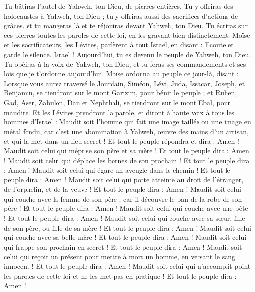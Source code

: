 \begin{multicols}{2}
Tu bâtiras l'autel de Yahweh, ton Dieu, de pierres entières. Tu y offriras des holocaustes à Yahweh, ton Dieu ;
tu y offriras aussi des sacrifices d’actions de grâces, et tu mangeras là et te réjouiras devant Yahweh, ton Dieu.
Tu écriras sur ces pierres toutes les paroles de cette loi, en les gravant bien distinctement.
Moïse et les sacrificateurs, les Lévites, parlèrent à tout Israël, en disant : Ecoute et garde le silence, Israël ! Aujourd'hui, tu es devenu le peuple de Yahweh, ton Dieu.
Tu obéiras à la voix de Yahweh, ton Dieu, et tu feras ses commandements et ses lois que je t’ordonne aujourd'hui.
Moïse ordonna au peuple ce jour-là, disant :
Lorsque vous aurez traversé le Jourdain, Siméon, Lévi, Juda, Issacar, Joseph, et Benjamin, se tiendront sur le mont Garizim, pour bénir le peuple ;
et Ruben, Gad, Aser, Zabulon, Dan et Nephthali, se tiendront sur le mont Ebal, pour maudire.
Et les Lévites prendront la parole, et diront à haute voix à tous les hommes d'Israël :
Maudit soit l'homme qui fait une image taillée ou une image en métal fondu, car c'est une abomination à Yahweh, œuvre des mains d'un artisan, et qui la met dans un lieu secret ! Et tout le peuple répondra et dira : Amen !
Maudit soit celui qui méprise son père et sa mère ! Et tout le peuple dira : Amen !
Maudit soit celui qui déplace les bornes de son prochain ! Et tout le peuple dira : Amen !
Maudit soit celui qui égare un aveugle dans le chemin ! Et tout le peuple dira : Amen !
Maudit soit celui qui porte atteinte au droit de l'étranger, de l'orphelin, et de la veuve ! Et tout le peuple dira : Amen !
Maudit soit celui qui couche avec la femme de son père ; car il découvre le pan de la robe de son père ! Et tout le peuple dira : Amen !
Maudit soit celui qui couche avec une bête ! Et tout le peuple dira : Amen !
Maudit soit celui qui couche avec sa sœur, fille de son père, ou fille de sa mère ! Et tout le peuple dira : Amen !
Maudit soit celui qui couche avec sa belle-mère ! Et tout le peuple dira : Amen !
Maudit soit celui qui frappe son prochain en secret ! Et tout le peuple dira : Amen !
Maudit soit celui qui reçoit un présent pour mettre à mort un homme, en versant le sang innocent ! Et tout le peuple dira : Amen !
Maudit soit celui qui n’accomplit point les paroles de cette loi et ne les met pas en pratique ! Et tout le peuple dira : Amen !

\end{multicols}
